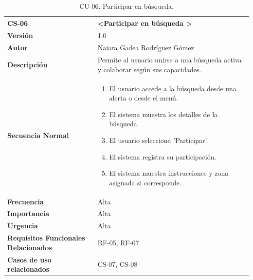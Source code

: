 \begin{table}[htbp] %
\centering
\begin{tabular}{ |m{3cm}|m{11cm}|  } 
\hline
\cellcolor[HTML]{B9E3F0}\centering\textbf{CS-06} & \cellcolor[HTML]{B9E3F0}\textbf{\textless Participar en búsqueda \textgreater}\\

\hline
\cellcolor[HTML]{EFEFEF}\textbf{Versión}             & 1.0  \\
\hline
\cellcolor[HTML]{EFEFEF}\textbf{Autor}                & Naiara Gadea Rodríguez Gómez\\
\hline
\cellcolor[HTML]{EFEFEF}\textbf{Descripción}                & { Permite al usuario unirse a una búsqueda activa y colaborar según sus capacidades. }\\
\hline
\cellcolor[HTML]{EFEFEF}\textbf{Secuencia \newline Normal}                &                 
        \begin{enumerate}
            \item El usuario accede a la búsqueda desde una alerta o desde el menú.
            \item El sistema muestra los detalles de la búsqueda.
            \item El usuario selecciona 'Participar'.
            \item El sistema registra su participación.
            \item El sistema muestra instrucciones y zona asignada si corresponde.
        \end{enumerate}\\
\hline
\cellcolor[HTML]{EFEFEF}\textbf{Frecuencia}                & Alta\\
\hline
\cellcolor[HTML]{EFEFEF}\textbf{Importancia}                & Alta\\
\hline
\cellcolor[HTML]{EFEFEF}\textbf{Urgencia}                & Alta\\
\hline
\cellcolor[HTML]{EFEFEF}\textbf{Requisitos Funcionales Relacionados}                & { RF-05, RF-07 }\\
\hline
\cellcolor[HTML]{EFEFEF}\textbf{Casos de uso relacionados}                & { CS-07, CS-08 }\\
\hline
\end{tabular}
\caption{CU-06. Participar en búsqueda.}
\end{table}


